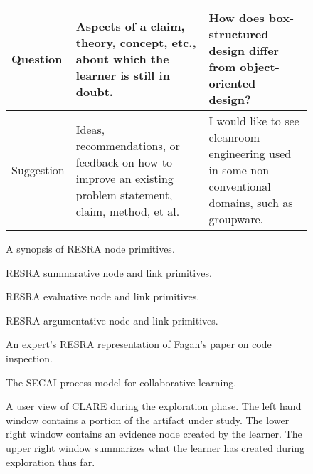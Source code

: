 \begin{figure}[h]
\begin{center}
\begin{tabular} {|l|p{2.5in}|p{2.5in}|}
      Question & Aspects of a claim, theory, concept, etc., about
      which the learner is still in doubt. & How does box-structured
      design differ from object-oriented design? \\ \hline
      
      Suggestion & Ideas, recommendations, or feedback on how to
      improve an existing problem statement, claim, method, et al.  &
      I would like to see cleanroom engineering used in some
      non-conventional domains, such as groupware. \\ \hline
    \end{tabular}
    \caption{A synopsis of RESRA node primitives.}
    \label{tab:resra}
  \end{center}
\end{figure}
\normalsize
{}

\newpage
\begin{figure}[h]
 \centerline{}
  \caption{ RESRA summarative node and link primitives.}
  \label{fig:sum-resra}
\end{figure}

\newpage
\begin{figure}[h]
 \centerline{}
 \caption{ RESRA evaluative node and link primitives.}
  \label{fig:eval-resra}
\end{figure}

\newpage
\begin{figure}[h]
 \centerline{}
 \caption{ RESRA argumentative node and link primitives.}
  \label{fig:arg-resra}
\end{figure}

\newpage
\begin{figure}[h]
 \centerline{}
 \caption{ An expert's RESRA representation of Fagan's paper on code inspection.}
  \label{fig:fagan}
\end{figure}

\newpage
\begin{figure}[h]
  \centerline{}
  \caption{ The SECAI process model for collaborative learning.}
  \label{fig:secai}
\end{figure}

\newpage
\begin{figure}[h]
  \centerline{}
  \caption{ A user view of CLARE during the exploration phase.  The left
  hand window contains a portion of the artifact under study.  The lower
  right window contains an evidence node created by the learner.  The upper
  right window summarizes what the learner has created during exploration
  thus far.}
  \label{fig:explore}
\end{figure}

